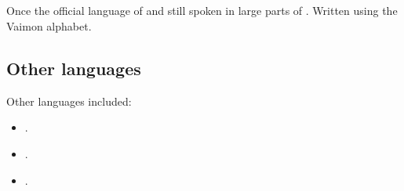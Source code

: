 \subsection{\Velcadian}
Once the official language of  and still spoken in large parts of \Velcad. 
Written using the Vaimon alphabet. 
















\subsection{Other languages}
Other languages included:
\begin{itemize}
  \item {}.
  \item {}.
  \item {}.
\end{itemize}










